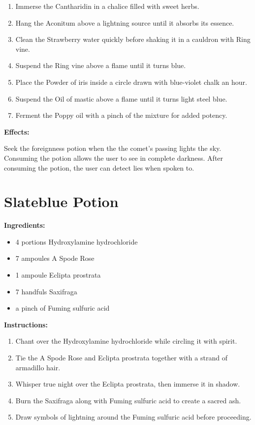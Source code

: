 \documentclass{article}
\begin{document}
\begin{enumerate}
  \item Immerse the Cantharidin in a chalice filled with sweet herbs.
  \item Hang the Aconitum above a lightning source until it absorbs its essence.
  \item Clean the Strawberry water quickly before shaking it in a cauldron with Ring vine.
  \item Suspend the Ring vine above a flame until it turns blue.
  \item Place the Powder of iris inside a circle drawn with blue-violet chalk an hour.
  \item Suspend the Oil of mastic above a flame until it turns light steel blue.
  \item Ferment the Poppy oil with a pinch of the mixture for added potency.
\end{enumerate}

\textbf{Effects:}

Seek the foreignness potion when the the comet’s passing lights the sky. Consuming the potion allows the user to see in complete darkness. After consuming the potion, the user can detect lies when spoken to.

\newpage
\section*{Slateblue Potion}

\textbf{Ingredients:}

\begin{itemize}
  \item 4 portions Hydroxylamine hydrochloride
  \item 7 ampoules A Spode Rose
  \item 1 ampoule Eclipta prostrata
  \item 7 handfuls Saxifraga
  \item a pinch of Fuming sulfuric acid
\end{itemize}

\textbf{Instructions:}

\begin{enumerate}
  \item Chant over the Hydroxylamine hydrochloride while circling it with spirit.
  \item Tie the A Spode Rose and Eclipta prostrata together with a strand of armadillo hair.
  \item Whisper true night over the Eclipta prostrata, then immerse it in shadow.
  \item Burn the Saxifraga along with Fuming sulfuric acid to create a sacred ash.
  \item Draw symbols of lightning around the Fuming sulfuric acid before proceeding.
\end{enumerate}
\end{document}
